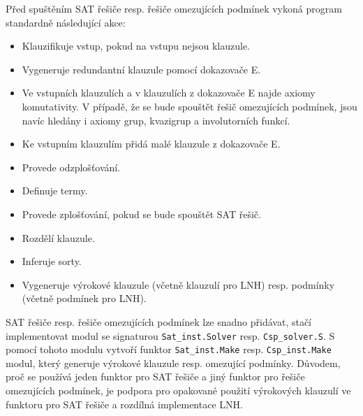 Před spuštěním SAT řešiče resp. řešiče omezujících podmínek
vykoná program \crossbow{} standardně následující akce:
\begin{itemize}
\item Klauzifikuje vstup, pokud na vstupu nejsou klauzule.
\item Vygeneruje redundantní klauzule pomocí dokazovače E.
\item Ve vstupních klauzulích a v klauzulích z dokazovače E
  najde axiomy komutativity. V případě, že se bude
  spouštět řešič omezujících podmínek, jsou navíc hledány
  i axiomy grup, kvazigrup a involutorních funkcí.
\item Ke vstupním klauzulím přidá malé klauzule z dokazovače E.
\item Provede odzplošťování.
\item Definuje termy.
\item Provede zplošťování, pokud se bude spouštět SAT řešič.
\item Rozdělí klauzule.
\item Inferuje sorty.
\item Vygeneruje výrokové klauzule (včetně klauzulí pro LNH)
  resp. podmínky (včetně podmínek pro LNH).
\end{itemize}

SAT řešiče resp. řešiče omezujících podmínek lze snadno přidávat,
stačí implementovat modul se signaturou \texttt{Sat\_inst.Solver}
resp. \texttt{Csp\_solver.S}. S pomocí tohoto modulu
vytvoří funktor \texttt{Sat\_inst.Make} resp. \texttt{Csp\_inst.Make}
modul, který generuje výrokové klauzule resp. omezující podmínky.
Důvodem, proč se používá jeden funktor pro SAT řešiče
a jiný funktor pro řešiče omezujících podmínek, je podpora
pro opakované použití výrokových klauzulí ve funktoru pro SAT řešiče
a rozdílná implementace LNH.
